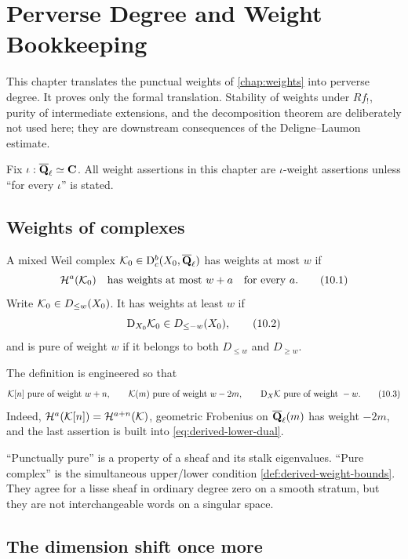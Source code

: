 \chapter{Perverse Degree and Weight Bookkeeping}
\label{chap:perverse-weights}

This chapter translates the punctual weights of
\cref{chap:weights} into perverse degree.  It proves only the formal
translation.  Stability of weights under \(Rf_!\), purity of intermediate
extensions, and the decomposition theorem are deliberately not used here;
they are downstream consequences of the Deligne--Laumon estimate.

Fix \(\iota:\overline{\mathbf Q}_\ell\simeq\mathbf C\).  All weight assertions in this chapter
are \(\iota\)-weight assertions unless “for every \(\iota\)” is stated.

\section{Weights of complexes}

\begin{definition}
\label{def:derived-weight-bounds}
A mixed Weil complex \(\mathcal K_0\in\mathrm D^b_c(X_0,\overline{\mathbf Q}_\ell)\) has weights at most \(w\)
if
\[
  \mathcal H^a(\mathcal K_0)\quad\text{has weights at most }w+a
  \quad\text{for every }a.
\tag{10.1}\label{eq:ordinary-derived-upper}
\]
Write \(\mathcal K_0\in D_{\leq w}(X_0)\).  It has weights at least \(w\) if
\[
  \mathrm D_{X_0}\mathcal K_0\in D_{\leq-w}(X_0),
\tag{10.2}\label{eq:derived-lower-dual}
\]
and is pure of weight \(w\) if it belongs to both
\(D_{\leq w}\) and \(D_{\geq w}\).
\end{definition}

The definition is engineered so that
\[
 \mathcal K[n]\text{ pure of weight }w+n,\qquad
 \mathcal K(m)\text{ pure of weight }w-2m,\qquad
 \mathrm D_X\mathcal K\text{ pure of weight }-w.
\tag{10.3}\label{eq:weight-shift-twist-dual}
\]
Indeed, \(\mathcal H^a(\mathcal K[n])=\mathcal H^{a+n}(\mathcal K)\), geometric Frobenius on
\(\overline{\mathbf Q}_\ell(m)\) has weight \(-2m\), and the last assertion is built into
\eqref{eq:derived-lower-dual}.

\begin{warning}
“Punctually pure” is a property of a sheaf and its stalk eigenvalues.
“Pure complex” is the simultaneous upper/lower condition
\cref{def:derived-weight-bounds}.  They agree for a lisse sheaf in ordinary
degree zero on a smooth stratum, but they are not interchangeable words on a
singular space.
\end{warning}

\section{The dimension shift once more}

